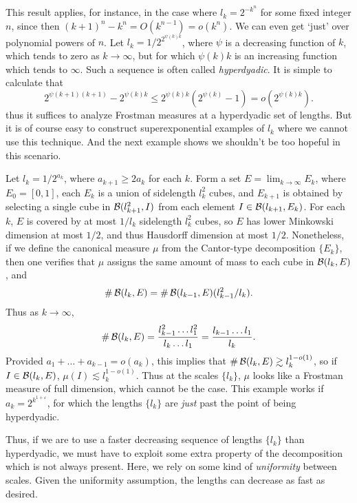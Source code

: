 This result applies, for instance, in the case where $l_k = 2^{-k^n}$ for some fixed integer $n$, since then $(k+1)^n - k^n = O(k^{n-1}) = o(k^n)$. We can even get `just' over polynomial powers of $n$. Let $l_k = 1/2^{2^{\psi(k) k}}$, where $\psi$ is a decreasing function of $k$, which tends to zero as $k \to \infty$, but for which $\psi(k) k$ is an increasing function which tends to $\infty$. Such a sequence is often called \emph{hyperdyadic}. It is simple to calculate that
%
\[ 2^{\psi(k+1) (k+1)} - 2^{\psi(k)k} \leq 2^{\psi(k)k}(2^{\psi(k)} - 1) = o(2^{\psi(k)k}). \]
%
thus it suffices to analyze Frostman measures at a hyperdyadic set of lengths. But it is of course easy to construct superexponential examples of $l_k$ where we cannot use this technique. And the next example shows we shouldn't be too hopeful in this scenario.

\begin{example}
	Let $l_k = 1/2^{a_k}$, where $a_{k+1} \geq 2a_k$ for each $k$. Form a set $E = \lim_{k \to \infty} E_k$, where $E_0 = [0,1]$, each $E_k$ is a union of sidelength $l_k^2$ cubes, and $E_{k+1}$ is obtained by selecting a single cube in $\operatorname{\mathcal{B}}(l_{k+1}^2,I)$ from each element $I \in \operatorname{\mathcal{B}}(l_{k+1}, E_k)$. For each $k$, $E$ is covered by at most $1/l_k$ sidelength $l_k^2$ cubes, so $E$ has lower Minkowski dimension at most $1/2$, and thus Hausdorff dimension at most $1/2$. Nonetheless, if we define the canonical measure $\mu$ from the Cantor-type decomposition $\{ E_k \}$, then one verifies that $\mu$ assigns the same amount of mass to each cube in $\operatorname{\mathcal{B}}(l_k,E)$, and
	\[ \# \operatorname{\mathcal{B}}(l_k,E) = \# \operatorname{\mathcal{B}}(l_{k-1},E) (l_{k-1}^2/l_k). \]
	Thus as $k \to \infty$,
	\[ \# \operatorname{\mathcal{B}}(l_k,E) = \frac{l_{k-1}^2 \dots l_1^2}{l_k \dots l_1} = \frac{l_{k-1} \dots l_1}{l_k}. \]
	Provided $a_1 + \dots + a_{k-1} = o(a_k)$, this implies that $\# \operatorname{\mathcal{B}}(l_k,E) \gtrsim l_k^{1 - o(1)}$, so if $I \in \operatorname{\mathcal{B}}(l_k,E)$, $\mu(I) \lesssim l_k^{1 - o(1)}$. Thus at the scales $\{ l_k \}$, $\mu$ looks like a Frostman measure of full dimension, which cannot be the case. This example works if $a_k = 2^{k^{1 + \varepsilon}}$, for which the lengths $\{ l_k \}$ are \emph{just} past the point of being hyperdyadic.
\end{example}

Thus, if we are to use a faster decreasing sequence of lengths $\{ l_k \}$ than hyperdyadic, we must have to exploit some extra property of the decomposition which is not always present. Here, we rely on some kind of \emph{uniformity} between scales. Given the uniformity assumption, the lengths can decrease as fast as desired.

